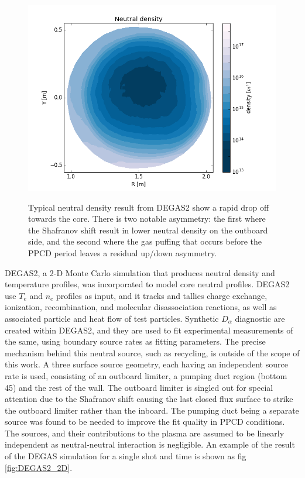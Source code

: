\documentclass[aip, pop, preprint]{revtex4-1}
\begin{document}
\begin{figure}
	\centering
	\includegraphics[width = 1.\linewidth]{./plots/degas_neutral_n}
	\label{fig:DEGAS2_2d_density}
	\caption{Typical neutral density result from DEGAS2 show a rapid drop off towards the core. There is two notable asymmetry: the first where the Shafranov shift result in lower neutral density on the outboard side, and the second where the gas puffing that occurs before the PPCD period leaves a residual up/down asymmetry.}
\end{figure}%

DEGAS2, a 2-D Monte Carlo simulation that produces  neutral density and temperature profiles, was incorporated to model core neutral profiles. DEGAS2 use  $ T_{e} $ and $ n_{e} $ profiles as input, and it tracks and tallies charge exchange, ionization, recombination, and molecular disassociation reactions, as well as associated particle and heat flow of test particles. Synthetic $ D_{\alpha} $ diagnostic are created within DEGAS2, and they are used to fit experimental measurements of the same, using boundary source rates as fitting parameters. The precise mechanism behind this neutral source, such as recycling, is outside of the scope of this work. A three surface source geometry, each having an independent source rate is used, consisting of an outboard limiter, a pumping duct region (bottom 45\textdegree) and the rest of the wall. The outboard limiter is singled out for special attention due to the Shafranov shift causing the last closed flux surface to strike the outboard limiter rather than the inboard. The pumping duct being a separate source was found to be needed to improve the fit quality in PPCD conditions. The sources, and their contributions to the plasma are assumed to be linearly independent as neutral-neutral interaction is negligible. An example of the result of the DEGAS simulation for a single shot and time is shown as fig \ref{fig:DEGAS2_2D}.
\end{document}
